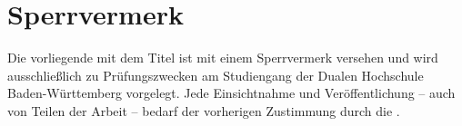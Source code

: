 
\thispagestyle{empty}
\section*{Sperrvermerk}

\vspace*{2em}

Die vorliegende {\arbeitsart} mit dem Titel {\itshape \titel} ist mit einem Sperrvermerk versehen und wird ausschließlich zu Prüfungszwecken am Studiengang {\studiengang} der Dualen Hochschule Baden-Württemberg {\abgabeort} vorgelegt.
Jede Einsichtnahme und Veröffentlichung – auch von Teilen der Arbeit – bedarf der vorherigen Zustimmung durch die {\firma}.
